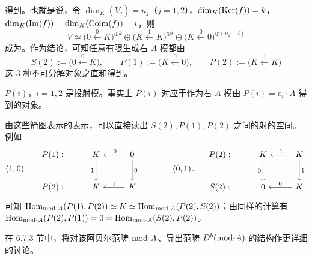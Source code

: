 得到。也就是说，令 $\dim_K(V_j)=n_j$（$j=1,2$），$\dim_K(\operatorname{Ker}(f))=k$，$\dim_K(\operatorname{Im}(f))=\dim_K(\operatorname{Coim}(f))=i$，则
\[
V\simeq\bigl(0\xleftarrow{\ 0\ }K\bigr)^{\oplus k}\oplus
\bigl(K\xleftarrow{\ 1\ }K\bigr)^{\oplus i}\oplus
\bigl(K\xleftarrow{\ 0\ }0\bigr)^{\oplus(n_2-i)}
\]
成为。作为结论，可知任意有限生成右 $A$ 模都由
\[
S(2):=\bigl(0\xleftarrow{\ 0\ }K\bigr),\qquad
P(1):=\bigl(K\xleftarrow{\ 0\ }0\bigr),\qquad
P(2):=\bigl(K\xleftarrow{\ 1\ }K\bigr)
\]
这 $3$ 种不可分解对象之直和得到。


$P(i)$，$i=1,2$ 是投射模。事实上 $P(i)$ 对应于作为右 $A$ 模由 $P(i)=e_i\cdot A$ 得到的对象。

由这些箭图表示的表示，可以直接读出 $S(2),P(1),P(2)$ 之间的射的空间。例如
\[
(1,0)\colon\quad
\begin{tikzcd}[row sep=2.2em, column sep=2.6em]
  P(1): & K \arrow[d,"1"'] & 0 \arrow[l,"0"'] \arrow[d,"0"] \\
  P(2): & K & K \arrow[l,"1"']
\end{tikzcd}
\qquad\qquad
(0,1)\colon\quad
\begin{tikzcd}[row sep=2.2em, column sep=2.6em]
  P(2): & K \arrow[d,"0"'] & K \arrow[l,"1"'] \arrow[d,"1"] \\
  S(2): & 0 & K \arrow[l,"0"']
\end{tikzcd}
\]
可知 $\operatorname{Hom}_{\mathrm{mod}\text{-}A}(P(1),P(2))\simeq K\simeq\operatorname{Hom}_{\mathrm{mod}\text{-}A}(P(2),S(2))$；由同样的计算有 $\operatorname{Hom}_{\mathrm{mod}\text{-}A}(P(2),P(1))=0=\operatorname{Hom}_{\mathrm{mod}\text{-}A}(S(2),P(2))$。

在 6.7.3 节中，将对该阿贝尔范畴 $\mathrm{mod}\text{-}A$、导出范畴 $D^{b}(\mathrm{mod}\text{-}A)$ 的结构作更详细的讨论。

